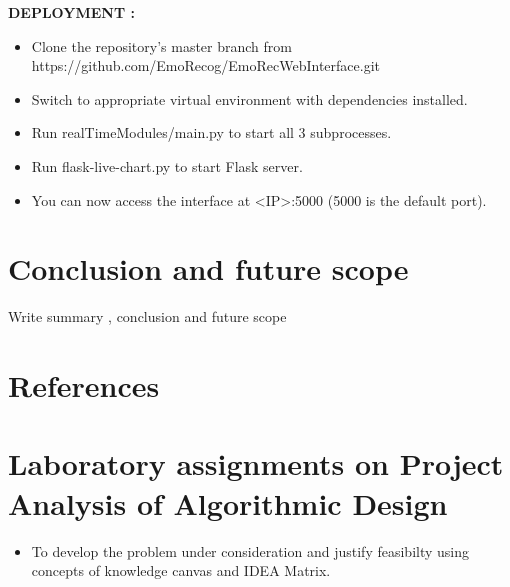 \documentclass[oneside,a4paper,12pt]{report}
\begin{document}
\begin{normalsize}
\begin{itemize}
\begin{itemize}
	\end{itemize}
\vspace{10mm}
    \textbf{DEPLOYMENT : }
    \begin{itemize}
    	\item Clone the repository's master branch from https://github.com/EmoRecog/EmoRecWebInterface.git
    	\newline
    	\item Switch to appropriate virtual environment with dependencies installed.
    	\newline
    	\item Run realTimeModules/main.py to start all 3 subprocesses.
    	\newline
    	\item Run flask-live-chart.py to start Flask server.
    	\newline
    	\item You can now access the interface at <IP>:5000 (5000 is the default port).
    	\newline
    \end{itemize}   
    
   \end{itemize} 
 \chapter{Conclusion and future scope}
Write  summary , conclusion and future scope
 {}

\begin{appendices}

\chapter{References}



\chapter{Laboratory assignments on Project Analysis of Algorithmic Design}
\begin{itemize}
\item To develop the problem under consideration and justify feasibilty using
concepts of knowledge canvas and IDEA Matrix.\\


\end{itemize}
\end{appendices}
\end{normalsize}
\end{document}

